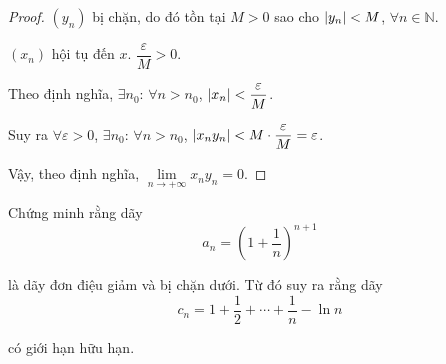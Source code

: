 \documentclass[class=analysis,crop=false]{standalone}
\begin{document}
\begin{proof}
    \par $(y_{n})$ bị chặn, do đó tồn tại $M > 0$ sao cho $\left\vert{y_{n}}\right\vert < M$, $\forall n\in\mathbb{N}$.
    \par $(x_{n})$ hội tụ đến $x$. $\dfrac{\varepsilon}{M} > 0$.
    \par Theo định nghĩa, $\exists n_{0}$: $\forall n > n_{0}$, $\left\vert{x_{n}}\right\vert < \dfrac{\varepsilon}{M}$.
    \par Suy ra $\forall\varepsilon > 0$, $\exists n_{0}$: $\forall n > n_{0}$, $\left\vert{x_{n}y_{n}}\right\vert < M\cdot\dfrac{\varepsilon}{M} = \varepsilon$.
    \par Vậy, theo định nghĩa, $\lim\limits_{n\to+\infty} x_{n}y_{n} = 0$.
\end{proof}

\begin{exercise}
    Chứng minh rằng dãy
    \[
        a_{n} = \left(1 + \frac{1}{n}\right)^{n+1}
    \]
    \par là dãy đơn điệu giảm và bị chặn dưới. Từ đó suy ra rằng dãy
    \[
        c_{n} = 1 + \frac{1}{2} + \cdots + \frac{1}{n} - \ln n
    \]
    \par có giới hạn hữu hạn.
\end{exercise}
\end{document}
